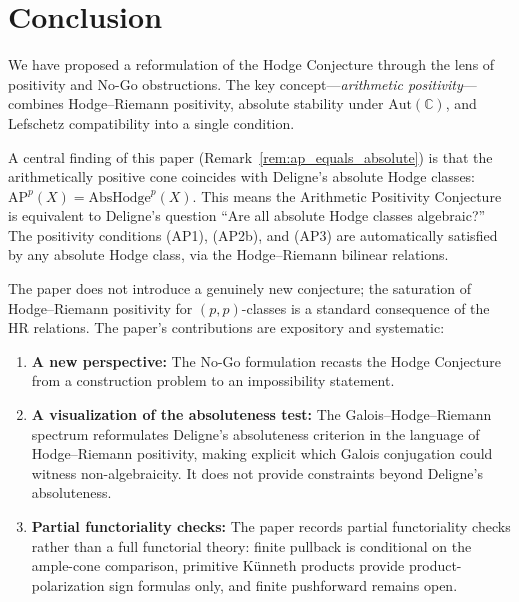 \documentclass[aps,prd,twocolumn,superscriptaddress,nofootinbib]{revtex4-2}
\theoremstyle{definition}
\theoremstyle{remark}
\begin{document}
\section{Conclusion}
\label{sec:conclusion}

We have proposed a reformulation of the Hodge Conjecture through the lens of positivity and No-Go obstructions. The key concept---\textit{arithmetic positivity}---combines Hodge--Riemann positivity, absolute stability under $\mathrm{Aut}(\mathbb{C})$, and Lefschetz compatibility into a single condition.

A central finding of this paper (Remark~\ref{rem:ap_equals_absolute}) is that the arithmetically positive cone coincides with Deligne's absolute Hodge classes: $\mathrm{AP}^p(X) = \mathrm{AbsHodge}^p(X)$. This means the Arithmetic Positivity Conjecture is equivalent to Deligne's question ``Are all absolute Hodge classes algebraic?'' The positivity conditions (AP1), (AP2b), and (AP3) are automatically satisfied by any absolute Hodge class, via the Hodge--Riemann bilinear relations.

The paper does not introduce a genuinely new conjecture; the saturation of Hodge--Riemann positivity for $(p,p)$-classes is a standard consequence of the HR relations. The paper's contributions are expository and systematic:

\begin{enumerate}
\item \textbf{A new perspective:} The No-Go formulation recasts the Hodge Conjecture from a construction problem to an impossibility statement.

\item \textbf{A visualization of the absoluteness test:} The Galois--Hodge--Riemann spectrum reformulates Deligne's absoluteness criterion in the language of Hodge--Riemann positivity, making explicit which Galois conjugation could witness non-algebraicity. It does not provide constraints beyond Deligne's absoluteness.

\item \textbf{Partial functoriality checks:} The paper records partial functoriality checks rather than a full functorial theory: finite pullback is conditional on the ample-cone comparison, primitive Künneth products provide product-polarization sign formulas only, and finite pushforward remains open.
\end{enumerate}
\end{document}
